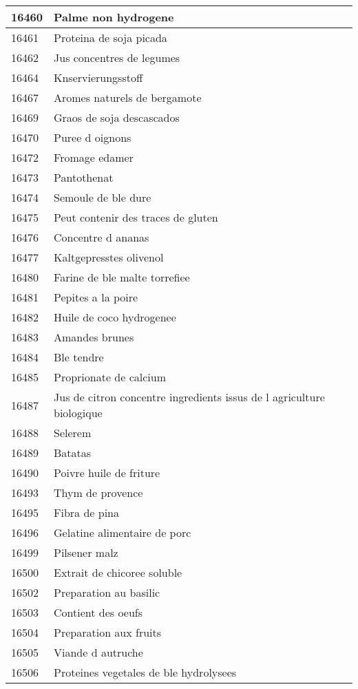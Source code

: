 \begin{longtable}{|l|l|}
16460 & Palme non hydrogene \\ \hline 
16461 & Proteina de soja picada \\ \hline 
16462 & Jus concentres de legumes \\ \hline 
16464 & Knservierungsstoff \\ \hline 
16467 & Aromes naturels de bergamote \\ \hline 
16469 & Graos de soja descascados \\ \hline 
16470 & Puree d oignons \\ \hline 
16472 & Fromage edamer \\ \hline 
16473 & Pantothenat \\ \hline 
16474 & Semoule de ble dure \\ \hline 
16475 & Peut contenir des traces de gluten \\ \hline 
16476 & Concentre d ananas \\ \hline 
16477 & Kaltgepresstes olivenol \\ \hline 
16480 & Farine de ble malte torrefiee \\ \hline 
16481 & Pepites a la poire \\ \hline 
16482 & Huile de coco hydrogenee \\ \hline 
16483 & Amandes brunes \\ \hline 
16484 & Ble tendre \\ \hline 
16485 & Proprionate de calcium \\ \hline 
16487 & Jus de citron concentre  ingredients issus de l agriculture biologique \\ \hline 
16488 & Selerem \\ \hline 
16489 & Batatas \\ \hline 
16490 & Poivre huile de friture \\ \hline 
16493 & Thym de provence \\ \hline 
16495 & Fibra de pina \\ \hline 
16496 & Gelatine alimentaire de porc \\ \hline 
16499 & Pilsener malz \\ \hline 
16500 & Extrait de chicoree soluble \\ \hline 
16502 & Preparation au basilic \\ \hline 
16503 & Contient des oeufs \\ \hline 
16504 & Preparation aux fruits \\ \hline 
16505 & Viande d autruche \\ \hline 
16506 & Proteines vegetales de ble hydrolysees \\ \hline 

\end{longtable}
